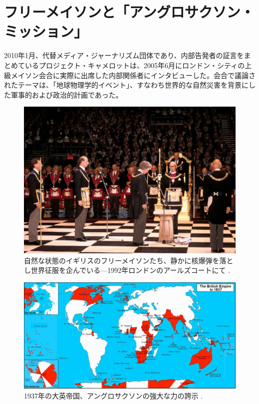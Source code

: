 \documentclass[10pt,twocolumn,letterpaper]{article}
\begin{document}
\section{フリーメイソンと「アングロサクソン・ミッション」}

2010年1月、代替メディア・ジャーナリズム団体であり、内部告発者の証言をまとめているプロジェクト・キャメロットは、2005年6月にロンドン・シティの上級メイソン会合に実際に出席した内部関係者にインタビューした\cite{4,6}。会合で議論されたテーマは、「地球物理学的イベント」、すなわち世界的な自然災害を背景にした軍事的および政治的計画であった。

\begin{figure}[b]
\begin{center}

\includegraphics[width=1\linewidth]{freemason.jpg}
\end{center}
   \caption{自然な状態のイギリスのフリーメイソンたち、静かに核爆弾を落とし世界征服を企んでいる—1992年ロンドンのアールズコートにて \cite{5}.}
\label{fig:1}
\label{fig:onecol}
\end{figure}

\begin{figure}[t]
\begin{center}
\includegraphics[width=1\textwidth]{british.jpg}
\end{center}
   \caption{1937年の大英帝国、アングロサクソンの強大な力の誇示 \cite{14}.}
   \label{fig:2}
\end{figure}
\end{document}
